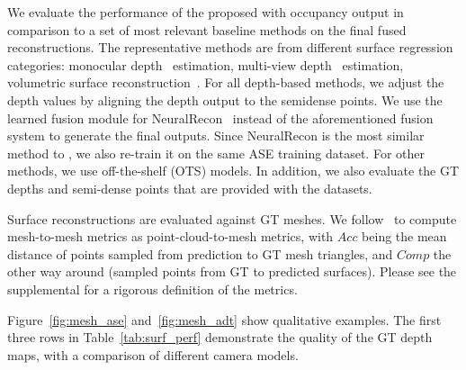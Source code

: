 We evaluate the performance of the proposed \EFMmodel{} with occupancy output in comparison to a set of most relevant baseline methods on the final fused reconstructions. The representative methods are from different surface regression categories: monocular depth~\cite{bhat2023zoedepth} estimation, multi-view depth~\cite{sayed2022simplerecon,khan2023tcod} estimation, volumetric surface reconstruction~\cite{sun2021neucon}. For all depth-based methods, we adjust the depth values by aligning the depth output to the semidense points. We use the learned fusion module for NeuralRecon~\cite{sun2021neucon} instead of the aforementioned fusion system to generate the final outputs. Since NeuralRecon is the most similar method to \EFMmodel{}, we also re-train it on the same ASE training dataset. For other methods, we use off-the-shelf (OTS) models.
In addition, we also evaluate the GT depths and semi-dense points that are provided with the datasets.
%
%


\newcommand{\subfigwidth}{0.24}


Surface reconstructions are evaluated against GT meshes. We follow~\cite{jensen2014large} to compute mesh-to-mesh metrics as point-cloud-to-mesh metrics, with $Acc$ being the mean distance of points sampled from prediction to GT mesh triangles, and $Comp$ the  other way around (sampled points from GT to predicted surfaces). Please see the supplemental for a rigorous definition of the metrics.


Figure~\ref{fig:mesh_ase} and~\ref{fig:mesh_adt} show qualitative examples. The first three rows in Table~\ref{tab:surf_perf} demonstrate the quality of the GT depth maps, with a comparison of different camera models.

